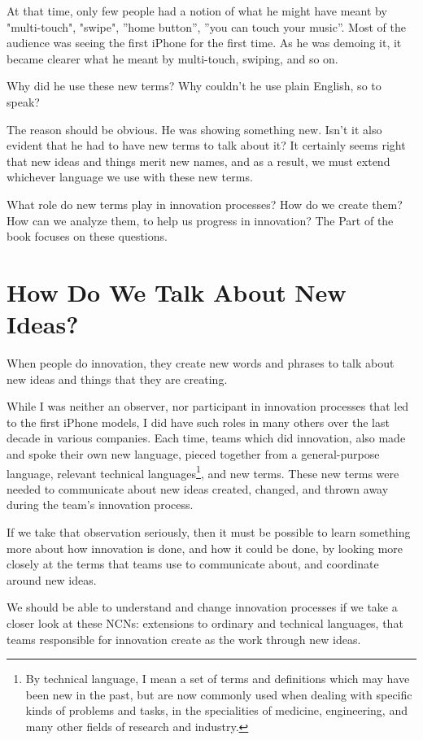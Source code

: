 \documentclass[graybox,envcountchap,sectrefs]{svmono}
\newcommand{\ncn}{NCN}
\begin{document}
At that time, only few people had a notion of what he might have meant by "multi-touch", "swipe", ''home button'', ''you can touch your music''. Most of the audience was seeing the first iPhone for the first time. As he was demoing it, it became clearer what he meant by multi-touch, swiping, and so on. 

Why did he use these new terms? Why couldn't he use plain English, so to speak? 

The reason should be obvious. He was showing something new. Isn't it also evident that he had to have new terms to talk about it? It certainly seems right that new ideas and things merit new names, and as a result, we must extend whichever language we use with these new terms. 

What role do new terms play in innovation processes? How do we create them? How can we analyze them, to help us progress in innovation? The Part of the book focuses on these questions.

\section{How Do We Talk About New Ideas?}
\label{c1-s2}
When people do innovation, they create new words and phrases to talk about new ideas and things that they are creating.

While I was neither an observer, nor participant in innovation processes that led to the first iPhone models, I did have such roles in many others over the last decade in various companies. Each time, teams which did innovation, also made and spoke their own new language, pieced together from a general-purpose language, relevant technical languages\footnote{By technical language, I mean a set of terms and definitions which may have been new in the past, but are now commonly used when dealing with specific kinds of problems and tasks, in the specialities of medicine, engineering, and many other fields of research and industry.}, and new terms. These new terms were needed to communicate about new ideas created, changed, and thrown away during the team's innovation process. 

If we take that observation seriously, then it must be possible to learn something more about how innovation is done, and how it could be done, by looking more closely at the terms that teams use to communicate about, and coordinate around new ideas. 

We should be able to understand and change innovation processes if we take a closer look at these \ncn s: extensions to ordinary and technical languages, that teams responsible for innovation create as the work through new ideas.
\end{document}
